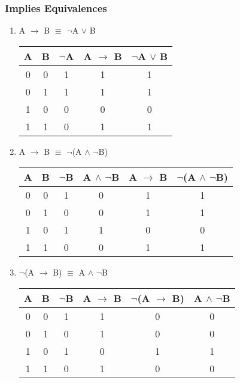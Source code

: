 \documentclass[12pt]{article}
\begin{document}
\subsubsection{Implies Equivalences}
\begin{enumerate}

  \item A $\to$ B $\equiv$ $\neg$A $\lor$ B

\begin{center}
  \begin{tabular}{| c | c | c | c | c |}
    \hline
    A & B & $\neg$A & A $\to$ B & $\neg$A $\lor$ B \\ \hline
    0 & 0 & 1 & 1 & 1 \\
    0 & 1 & 1 & 1 & 1 \\ 
    1 & 0 & 0 & 0 & 0 \\
    1 & 1 & 0 & 1 & 1 \\ \hline
  \end{tabular}
\end{center}

  \item A $\to$ B $\equiv$ $\neg$(A $\land$ $\neg$B)

\begin{center}
  \begin{tabular}{| c | c | c | c | c | c |}
    \hline
    A & B & $\neg$B & A $\land$ $\neg$B & A $\to$ B & $\neg$(A $\land$ $\neg$B) \\ \hline
    0 & 0 & 1 & 0 & 1 & 1 \\
    0 & 1 & 0 & 0 & 1 & 1 \\
    1 & 0 & 1 & 1 & 0 & 0 \\
    1 & 1 & 0 & 0 & 1 & 1 \\ \hline
  \end{tabular}
\end{center}

  \item $\neg$(A $\to$ B) $\equiv$ A $\land$ $\neg$B

\begin{center}
  \begin{tabular}{| c | c | c | c | c | c |}
    \hline
    A & B & $\neg$B & A $\to$ B & $\neg$(A $\to$ B) & A $\land$ $\neg$B \\ \hline
    0 & 0 & 1 & 1 & 0 & 0 \\
    0 & 1 & 0 & 1 & 0 & 0 \\
    1 & 0 & 1 & 0 & 1 & 1 \\
    1 & 1 & 0 & 1 & 0 & 0 \\ \hline
  \end{tabular}
\end{center}
\end{enumerate}
\end{document}

